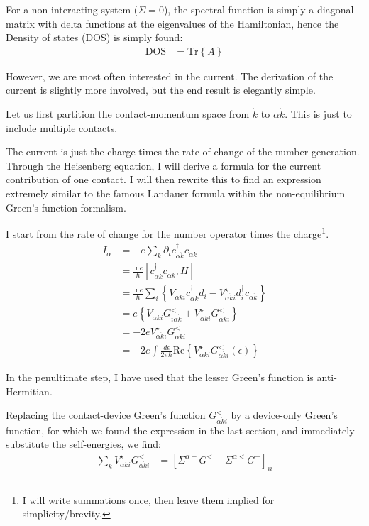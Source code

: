 For a non-interacting system ($\Sigma=0$), the spectral function is simply a diagonal matrix with delta functions at the eigenvalues of the Hamiltonian, hence the Density of states (DOS) is simply found:
\begin{align}
\text{DOS} &= \text{Tr}\left\{A\right\}
\label{eq:dos}
\end{align}


However, we are most often interested in the current. The derivation of the current is slightly more involved, but the end result is elegantly simple.

Let us first partition the contact-momentum space from $\dot{k}$ to $\alpha\dot{k}$. This is just to include multiple contacts.

The current is just the charge times the rate of change of the number generation. Through the Heisenberg equation, I will derive a formula for the current contribution of one contact. I will then rewrite this to find an expression extremely similar to the famous Landauer formula within the non-equilibrium Green's function formalism.

I start from the rate of change for the number operator times the charge\footnote{I will write summations once, then leave them implied for simplicity/brevity.}.  
\begin{align*}
I_\alpha &= - e \sum_{\dot{k}} \partial_t c^\dagger_{\alpha\dot{k}} c_{\alpha\dot{k}} \\
&= \frac{\imath e}{\hbar} \left[ c^\dagger_{\alpha\dot{k}} c_{\alpha\dot{k}}, H\right] \\
&= \frac{\imath e}{\hbar}\sum_i \left\{ V_{\alpha\dot{k}i} c^\dagger_{\alpha\dot{k}} d_i - V^\star_{\alpha\dot{k}i} d_i^\dagger c_{\alpha\dot{k}}\right\} \\
&= e \left\{ V_{\alpha\dot{k}i} G^<_{i\alpha\dot{k}} + V_{\alpha\dot{k}i}^\star G^<_{\alpha\dot{k}i}\right\}\\
&= -2e V^\star_{\alpha\dot{k}i}G^<_{\alpha\dot{k}i} \\
&= -2e \int \frac{d\epsilon}{2\pi\hbar} \text{Re}\left\{ V^\star_{\alpha\dot{k}i} G^<_{\alpha\dot{k}i} (\epsilon) \right\}
\end{align*}

In the penultimate step, I have used that the lesser Green's function is anti-Hermitian. 

Replacing the contact-device Green's function $G^<_{\alpha\dot{k}i}$ by a device-only Green's function, for which we found the expression in the last section, and immediately substitute the self-energies, we find:
\begin{align*}
\sum_{\dot{k}} V^\star_{\alpha\dot{k}i} G^<_{\alpha\dot{k}i} &= \left[\Sigma^{\alpha+} G^< + \Sigma^{\alpha <} G^-\right]_{ii}
\end{align*}

